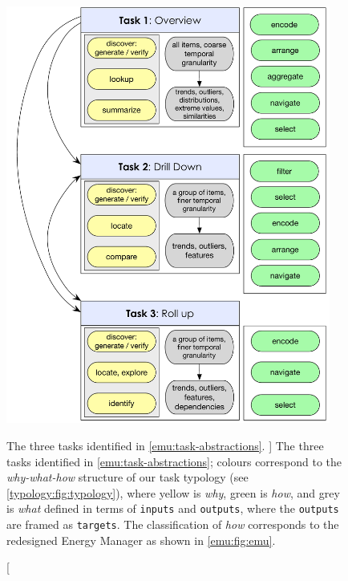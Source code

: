  \begin{figure}
	\centering
	\includegraphics[width=0.95\textwidth]{figures/emu-tasks}
	\caption
	[
	   The three tasks identified in \autoref{emu:task-abstractions}.
	]
	{
	   The three tasks identified in \autoref{emu:task-abstractions}; colours correspond to the {\it why-what-how} structure of our task typology (see \autoref{typology:fig:typology}), where yellow is {\it why}, green is {\it how}, and grey is {\it what} defined in terms of {\tt inputs} and {\tt outputs}, where the {\tt outputs} are framed as {\tt targets}.
	   The classification of {\it how} corresponds to the redesigned Energy Manager as shown in \autoref{emu:fig:emu}.
	}
	\centering
	\label{fig:emu:tasks}
\end{figure}


\endinput
